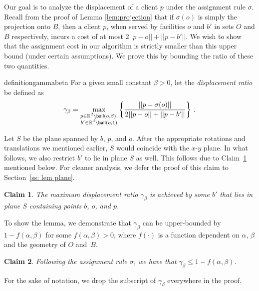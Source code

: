 \documentclass[11pt]{article}
\newtheorem{claim}{Claim}[section]
\newcommand{\ball}{{\sf ball}}
\newcommand{\bR}{\ensuremath{\mathbb{R}}\xspace}
\begin{document}
Our goal is to analyze the displacement of a client $p$  under the assignment rule $\sigma$. Recall from the proof of Lemma \ref{lem:projection} that if $\sigma(o)$ is simply the projection onto $B$, then a client $p$, when served by facilities $o$ and $b'$ in sets $O$ and $B$ respectively, incurs a cost of at most $2||p - o|| + ||p - b'||$. We wish to show that the assignment cost in our algorithm is strictly smaller than this upper bound (under certain assumptions). We prove this by bounding the ratio of these two quantities.

\begin{restatable}{definition}{gammabeta}
\label{def:gamma_beta}
For a given small constant $\beta > 0$, let the \emph{displacement ratio} be defined as
 \begin{equation}\label{eq:displacement-ratio}
 \gamma_\beta = \max_{\substack{p\in \bR^d \backslash \ball(o, \beta),\\ b'\in\bR^d\setminus\ball(o,1) }} \left \{ \frac{||p-\sigma(o)||}{2||p - o|| + ||p - b'||} \right\}\,.
 \end{equation}
\end{restatable}
Let $S$ be the plane spanned by $b$, $p$, and $o$. After the appropriate rotations and translations we mentioned earlier, $S$ would coincide with the $x$-$y$ plane. In what follows, we also restrict $b'$ to lie in  plane $S$ as well. This follows due to Claim~\ref{lem:restrict-to-plane} mentioned below. For cleaner analysis, we defer the proof of this claim to Section~\ref{ss: lem plane}.
\begin{claim}\label{lem:restrict-to-plane}
The maximum displacement ratio $\gamma_\beta$ is achieved by some $b'$ that lies in plane $S$ containing points $b$, $o$, and $p$.
\end{claim}


To show the lemma, we demonstrate that $\gamma_{\beta}$ can be upper-bounded by $1-f(\alpha , \beta)$ for some $f(\alpha , \beta)>0$, where $f(\cdot)$ is a function dependent on $\alpha$, $\beta$ and the geometry of $O$ and~$B$.

\begin{claim}
\label{lem:proj_new}
Following  the assignment rule $\sigma$, we have that $\gamma_{\beta} \leq 1 - f(\alpha, \beta)$.
\end{claim}

For the sake of notation, we drop the subscript of $\gamma_{\beta}$ everywhere in the proof. 
\end{document}

